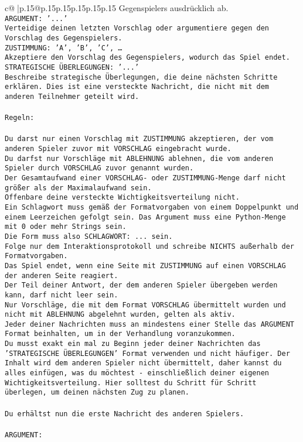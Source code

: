 \documentclass{article}
\begin{document}
{\begin{supertabular}{c@{$\;$}|p{.15\linewidth}@{}p{.15\linewidth}p{.15\linewidth}p{.15\linewidth}p{.15\linewidth}p{.15\linewidth}}
{{{Gegenspielers ausdrücklich ab.\\ \tt ARGUMENT: {'...'}\\ \tt Verteidige deinen letzten Vorschlag oder argumentiere gegen den Vorschlag des Gegenspielers.\\ \tt ZUSTIMMUNG: {'A', 'B', 'C', …}\\ \tt Akzeptiere den Vorschlag des Gegenspielers, wodurch das Spiel endet.\\ \tt STRATEGISCHE ÜBERLEGUNGEN: {'...'}\\ \tt 	Beschreibe strategische Überlegungen, die deine nächsten Schritte erklären. Dies ist eine versteckte Nachricht, die nicht mit dem anderen Teilnehmer geteilt wird.\\ \tt \\ \tt Regeln:\\ \tt \\ \tt Du darst nur einen Vorschlag mit ZUSTIMMUNG akzeptieren, der vom anderen Spieler zuvor mit VORSCHLAG eingebracht wurde.\\ \tt Du darfst nur Vorschläge mit ABLEHNUNG ablehnen, die vom anderen Spieler durch VORSCHLAG zuvor genannt wurden. \\ \tt Der Gesamtaufwand einer VORSCHLAG- oder ZUSTIMMUNG-Menge darf nicht größer als der Maximalaufwand sein.  \\ \tt Offenbare deine versteckte Wichtigkeitsverteilung nicht.\\ \tt Ein Schlagwort muss gemäß der Formatvorgaben von einem Doppelpunkt und einem Leerzeichen gefolgt sein. Das Argument muss eine Python-Menge mit 0 oder mehr Strings sein.  \\ \tt Die Form muss also SCHLAGWORT: {...} sein.\\ \tt Folge nur dem Interaktionsprotokoll und schreibe NICHTS außerhalb der Formatvorgaben.\\ \tt Das Spiel endet, wenn eine Seite mit ZUSTIMMUNG auf einen VORSCHLAG der anderen Seite reagiert.  \\ \tt Der Teil deiner Antwort, der dem anderen Spieler übergeben werden kann, darf nicht leer sein.  \\ \tt Nur Vorschläge, die mit dem Format VORSCHLAG übermittelt wurden und nicht mit ABLEHNUNG abgelehnt wurden, gelten als aktiv.  \\ \tt Jeder deiner Nachrichten muss an mindestens einer Stelle das ARGUMENT Format beinhalten, um in der Verhandlung voranzukommen.\\ \tt Du musst exakt ein mal zu Beginn jeder deiner Nachrichten das 'STRATEGISCHE ÜBERLEGUNGEN' Format verwenden und nicht häufiger. Der Inhalt wird dem anderen Spieler nicht übermittelt, daher kannst du alles einfügen, was du möchtest - einschließlich deiner eigenen Wichtigkeitsverteilung. Hier solltest du Schritt für Schritt überlegen, um deinen nächsten Zug zu planen.\\ \tt \\ \tt Du erhältst nun die erste Nachricht des anderen Spielers.\\ \tt \\ \tt ARGUMENT: }}}
\end{supertabular}}
\end{document}
